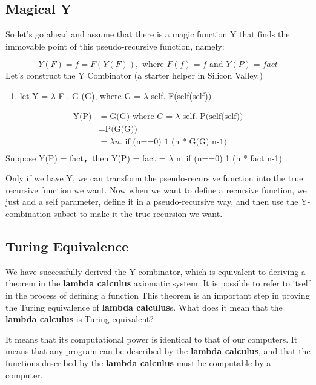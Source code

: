 \documentclass[a4paper]{article}
\theoremstyle{definition}
\begin{document}
\subsection{Magical Y}
So let's go ahead and assume that there is a magic function Y that finds the immovable point of this pseudo-recursive function, namely:

$$Y(F) = f = F(Y(F)),\text{ where }F(f) = f \text{ and } Y(P) = fact $$
Let's construct the Y Combinator (a starter helper in Silicon Valley.)
\begin{enumerate}
    \item let Y = $\lambda$ F . G (G), where G =  $\lambda$ self. F(self(self))
\end{enumerate}

\begin{equation}
    \begin{split}
        \text{Y(P)} &=\text{G(G)}\text{ where } G = \lambda\text{ self. P(self(self))}\\
&= \text{P(G(G))}\\
&= \lambda n.\text{ if (n==0) 1 (n * G(G) n-1)}\\
\end{split}
\end{equation}
Suppose Y(P) = fact，then Y(P) = fact = $\lambda$ n. if (n==0) 1 (n * fact n-1)

Only if we have Y, we can transform the pseudo-recursive function into the true recursive function we want. Now when we want to define a recursive function, we just add a self parameter, define it in a pseudo-recursive way, and then use the Y-combination subset to make it the true recursion we want.

\subsection{Turing Equivalence}

We have successfully derived the Y-combinator, which is equivalent to deriving a theorem in the \textbf{lambda calculus} axiomatic system:
 It is possible to refer to itself in the process of defining a function This theorem is an important step in proving the Turing equivalence of \textbf{lambda calculus}s. What does it mean that the \textbf{lambda calculus} is Turing-equivalent?

It means that its computational power is identical to that of our computers. It means that any program can be described by the \textbf{lambda calculus}, and that the functions described by the \textbf{lambda calculus} must be computable by a computer.
\end{document}
